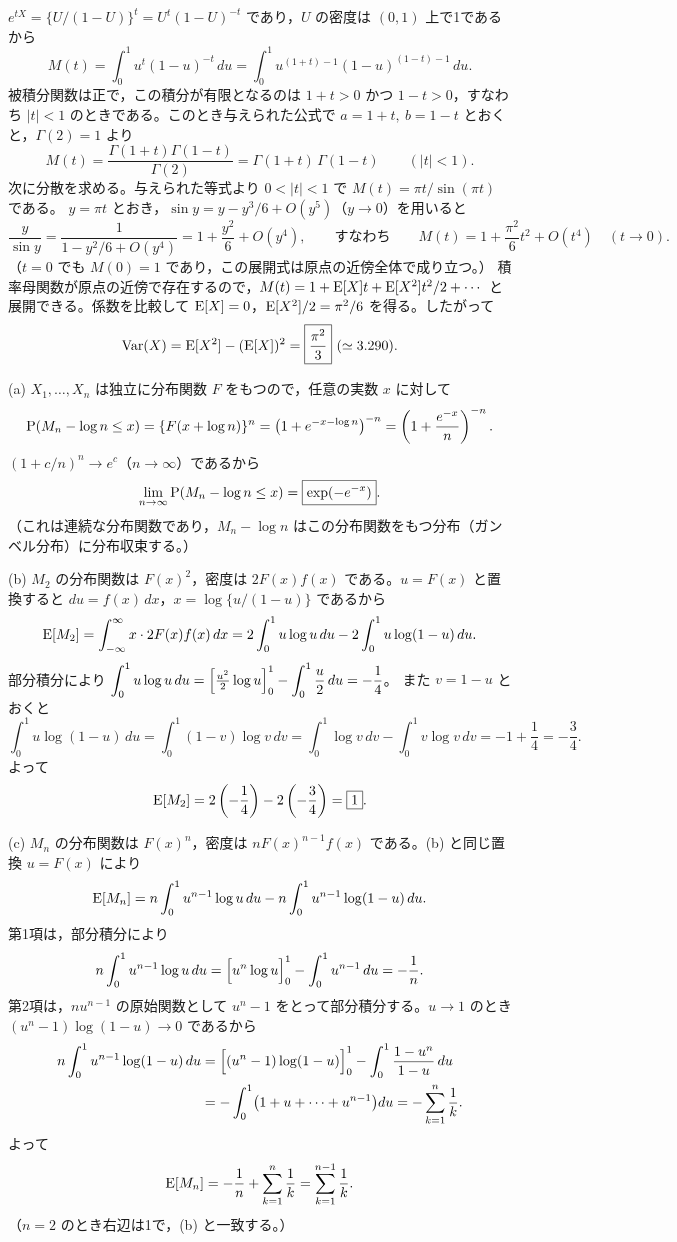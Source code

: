 \documentclass[a4paper,11pt]{ltjsarticle}
\begin{document}
$e^{tX}=\{U/(1-U)\}^t=U^t(1-U)^{-t}$ であり，$U$ の密度は $(0,1)$ 上で1であるから
\[
M(t)=\int_0^1u^{t}(1-u)^{-t}\,du=\int_0^1u^{(1+t)-1}(1-u)^{(1-t)-1}\,du .
\]
被積分関数は正で，この積分が有限となるのは $1+t>0$ かつ $1-t>0$，すなわち $|t|<1$ のときである。このとき与えられた公式で $a=1+t,\ b=1-t$ とおくと，$\Gamma(2)=1$ より
\[
M(t)=\frac{\Gamma(1+t)\Gamma(1-t)}{\Gamma(2)}=\Gamma(1+t)\,\Gamma(1-t)\qquad(|t|<1).
\]
次に分散を求める。与えられた等式より $0<|t|<1$ で $M(t)=\pi t/\sin(\pi t)$ である。
$y=\pi t$ とおき，$\sin y=y-y^3/6+O(y^5)$（$y\to0$）を用いると
\[
\frac{y}{\sin y}=\frac{1}{1-y^2/6+O(y^4)}=1+\frac{y^2}{6}+O(y^4),
\qquad\text{すなわち}\qquad
M(t)=1+\frac{\pi^2}{6}t^2+O(t^4)\quad(t\to0).
\]
（$t=0$ でも $M(0)=1$ であり，この展開式は原点の近傍全体で成り立つ。）
積率母関数が原点の近傍で存在するので，$M(t)=1+\operatorname{E}[X]t+\operatorname{E}[X^2]t^2/2+\cdots$ と展開できる。係数を比較して
$\operatorname{E}[X]=0$，$\operatorname{E}[X^2]/2=\pi^2/6$ を得る。したがって
\[
\Var(X)=\E[X^2]-(\E[X])^2=\boxed{\frac{\pi^2}{3}}\ (\simeq3.290).
\]

(a) $X_1,\ldots,X_n$ は独立に分布関数 $F$ をもつので，任意の実数 $x$ に対して
\[
\operatorname{P}(M_n-\log n\le x)=\{F(x+\log n)\}^n=\left(1+e^{-x-\log n}\right)^{-n}
=\left(1+\frac{e^{-x}}{n}\right)^{-n}.
\]
$(1+c/n)^n\to e^c$（$n\to\infty$）であるから
\[
\lim_{n\to\infty}\operatorname{P}(M_n-\log n\le x)=\boxed{\exp(-e^{-x})}.
\]
（これは連続な分布関数であり，$M_n-\log n$ はこの分布関数をもつ分布（ガンベル分布）に分布収束する。）

(b) $M_2$ の分布関数は $F(x)^2$，密度は $2F(x)f(x)$ である。$u=F(x)$ と置換すると $du=f(x)\,dx$，$x=\log\{u/(1-u)\}$ であるから
\[
\operatorname{E}[M_2]=\int_{-\infty}^{\infty}x\cdot2F(x)f(x)\,dx
=2\int_0^1u\log u\,du-2\int_0^1u\log(1-u)\,du .
\]
部分積分により $\displaystyle\int_0^1u\log u\,du=\Bigl[\tfrac{u^2}{2}\log u\Bigr]_0^1-\int_0^1\frac u2\,du=-\frac14$。
また $v=1-u$ とおくと
\[
\int_0^1u\log(1-u)\,du=\int_0^1(1-v)\log v\,dv=\int_0^1\log v\,dv-\int_0^1v\log v\,dv=-1+\frac14=-\frac34 .
\]
よって
\[
\operatorname{E}[M_2]=2\left(-\frac14\right)-2\left(-\frac34\right)=\boxed{1}.
\]

(c) $M_n$ の分布関数は $F(x)^n$，密度は $nF(x)^{n-1}f(x)$ である。(b) と同じ置換 $u=F(x)$ により
\[
\operatorname{E}[M_n]=n\int_0^1u^{n-1}\log u\,du-n\int_0^1u^{n-1}\log(1-u)\,du .
\]
第1項は，部分積分により
\[
n\int_0^1u^{n-1}\log u\,du=\Bigl[u^n\log u\Bigr]_0^1-\int_0^1u^{n-1}\,du=-\frac1n .
\]
第2項は，$nu^{n-1}$ の原始関数として $u^n-1$ をとって部分積分する。$u\to1$ のとき $(u^n-1)\log(1-u)\to0$ であるから
\begin{align*}
n\int_0^1u^{n-1}\log(1-u)\,du&=\Bigl[(u^n-1)\log(1-u)\Bigr]_0^1-\int_0^1\frac{1-u^n}{1-u}\,du\\
&=-\int_0^1\bigl(1+u+\cdots+u^{n-1}\bigr)du=-\sum_{k=1}^{n}\frac1k .
\end{align*}
よって
\[
\operatorname{E}[M_n]=-\frac1n+\sum_{k=1}^{n}\frac1k=\sum_{k=1}^{n-1}\frac1k .
\]
（$n=2$ のとき右辺は1で，(b) と一致する。）
\newpage
\end{document}
